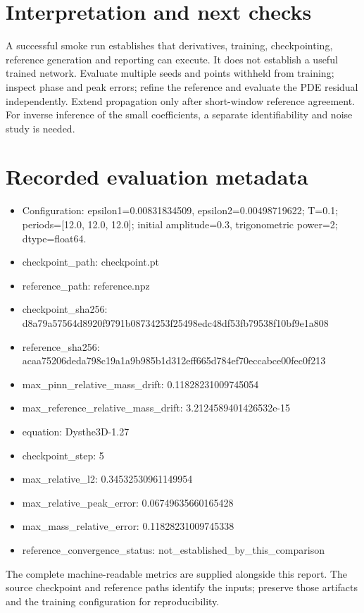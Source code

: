 \documentclass[10pt]{article}
\begin{document}
\section{Interpretation and next checks}
A successful smoke run establishes that derivatives, training, checkpointing, reference generation and reporting can execute. It does not establish a useful trained network. Evaluate multiple seeds and points withheld from training; inspect phase and peak errors; refine the reference and evaluate the PDE residual independently. Extend propagation only after short-window reference agreement. For inverse inference of the small coefficients, a separate identifiability and noise study is needed.
\section{Recorded evaluation metadata}
{\small\raggedright\begin{itemize}
\item Configuration: epsilon1=0.00831834509, epsilon2=0.00498719622; T=0.1; periods=[12.0, 12.0, 12.0]; initial amplitude=0.3, trigonometric power=2; dtype=float64.
\item checkpoint\_path: checkpoint.pt
\item reference\_path: reference.npz
\item checkpoint\_sha256: d8a79a57564d8920\allowbreak{}f9791b08734253f2\allowbreak{}5498edc48df53fb7\allowbreak{}9538f10bf9e1a808
\item reference\_sha256: acaa75206deda798\allowbreak{}c19a1a9b985b1d31\allowbreak{}2eff665d784ef70e\allowbreak{}ccabce00fec0f213
\item max\_pinn\_relative\_mass\_drift: 0.11828231009745054
\item max\_reference\_relative\_mass\_drift: 3.2124589401426532e-15
\item equation: Dysthe3D-1.27
\item checkpoint\_step: 5
\item max\_relative\_l2: 0.34532530961149954
\item max\_relative\_peak\_error: 0.06749635660165428
\item max\_mass\_relative\_error: 0.11828231009745338
\item reference\_convergence\_status: not\_\allowbreak{}established\_\allowbreak{}by\_\allowbreak{}this\_\allowbreak{}comparison
\end{itemize}}
The complete machine-readable metrics are supplied alongside this report. The source checkpoint and reference paths identify the inputs; preserve those artifacts and the training configuration for reproducibility.
\end{document}
